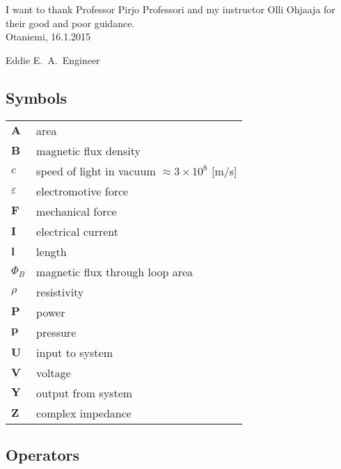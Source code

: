 \documentclass[english,12pt,a4paper,pdftex,elec,utf8]{aaltothesis}
\begin{document}
I want to thank Professor Pirjo Professori
and my instructor Olli Ohjaaja for their 
good and poor guidance.\\

\vspace{5cm}
Otaniemi, 16.1.2015

\vspace{5mm}
{\hfill Eddie E.\ A.\ Engineer \hspace{1cm}}

\newpage


\thesistableofcontents



\subsection*{Symbols}

\begin{tabular}{ll}
$\mathbf{A}$  & area \\
$\mathbf{B}$  & magnetic flux density  \\
$c$           & speed of light in vacuum $\approx 3\times10^8$ [m/s]\\
$\varepsilon$ & electromotive force \\
$\mathbf{F}$  & mechanical force \\
$\mathbf{I}$  & electrical current \\
$\mathbf{l}$  & length \\
$\Phi_{B}$    & magnetic flux through loop area \\
$\rho$        & resistivity \\
$\mathbf{P}$  & power \\
$\mathbf{p}$  & pressure \\
$\mathbf{U}$  & input to system \\
$\mathbf{V}$  & voltage \\
$\mathbf{Y}$  & output from system \\
$\mathbf{Z}$  & complex impedance
\end{tabular}

\subsection*{Operators}
\end{document}
